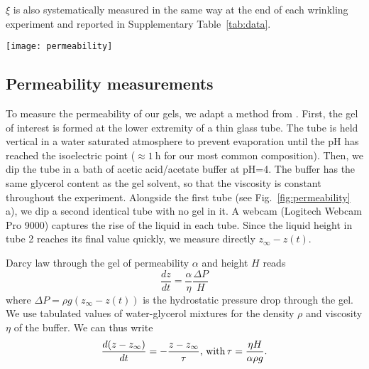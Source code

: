 \documentclass[twocolumn,superscriptaddress,showpacs,preprintnumbers,
amsmath,amssymb,prl]{revtex4-1}
\begin{document}
$\xi$ is also systematically measured in the same way at the end of each wrinkling experiment and reported in Supplementary Table~\ref{tab:data}. %


\begin{figure*}%
	\texttt{[image: permeability]}%
	\caption{Permeability measurements. (a) Schematic representation of the experiment. (b-c) Evolution of the height of the interface in tube 1 relative to the final height in tube 2. The black line is the best exponential fit $Ae^{-t/\tau}$. (b) Gel is 4\%w casein, 4\%w GDL in water, $H=\SI{2.3}{\milli\metre}$ and $\tau=\SI{57}{\minute}$. (c) Same as (b) for a 50\%w glycerol--water mixture, $H=\SI{4}{\milli\metre}$ and $\tau=\SI{100}{\hour}$.}%
	\label{fig:permeability}%
\end{figure*}
\subsection*{Permeability measurements}

To measure the permeability of our gels, we adapt a method from \cite{VanDijk1986}. First, the gel of interest is formed at the lower extremity of a thin glass tube. The tube is held vertical in a water saturated atmosphere to prevent evaporation until the pH has reached the isoelectric point ($\approx\SI{1}{\hour}$ for our most common composition). Then, we dip the tube in a bath of acetic acid/acetate buffer at pH=4. The buffer has the same glycerol content as the gel solvent, so that the viscosity is constant throughout the experiment. Alongside the first tube (see Fig.~\ref{fig:permeability} a), we dip a second identical tube with no gel in it. A webcam (Logitech Webcam Pro 9000) captures the rise of the liquid in each tube. Since the liquid height in tube 2 reaches its final value quickly, we measure directly $z_\infty-z(t)$.

Darcy law through the gel of permeability $\alpha$ and height $H$ reads 
\begin{equation}
\frac{dz}{dt} = \frac{\alpha}{\eta}\frac{\Delta P}{H}
\end{equation}
where $\Delta P=\rho g(z_\infty-z(t))$ is the hydrostatic pressure drop through the gel. We use tabulated values of water-glycerol mixtures for the density $\rho$ and viscosity $\eta$ of the buffer. We can thus write
\begin{equation}
\frac{d(z-z_\infty)}{dt} = -\frac{z-z_\infty}{\tau}\text{, with\,} \tau = \frac{\eta H}{\alpha \rho g}.
\end{equation}
\end{document}
